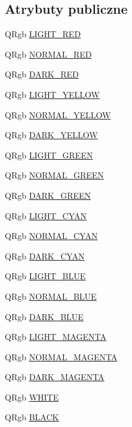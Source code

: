 \subsection*{Atrybuty publiczne}
\begin{CompactItemize}
\item 
QRgb \hyperlink{classPColorManager_cbc4c8b260f0ba856d8454ae2f9320d5}{LIGHT\_\-RED}
\item 
QRgb \hyperlink{classPColorManager_c6f06fc1bb188fe7d7f573ff3c46df8d}{NORMAL\_\-RED}
\item 
QRgb \hyperlink{classPColorManager_3690840932799e3d910dd3d673f90363}{DARK\_\-RED}
\item 
QRgb \hyperlink{classPColorManager_945305800d979369bb29d9f3ec5fe7f3}{LIGHT\_\-YELLOW}
\item 
QRgb \hyperlink{classPColorManager_a1086408be008b97df57f579702d624e}{NORMAL\_\-YELLOW}
\item 
QRgb \hyperlink{classPColorManager_347da61b74a87e7eed4b8849a8128e11}{DARK\_\-YELLOW}
\item 
QRgb \hyperlink{classPColorManager_45eba1a3facb6995710a2d1e9026ca7c}{LIGHT\_\-GREEN}
\item 
QRgb \hyperlink{classPColorManager_a2e75d69d65d6a7f87a470c0782a7624}{NORMAL\_\-GREEN}
\item 
QRgb \hyperlink{classPColorManager_ec8d0fe14a68b42be5c5d8d77f914411}{DARK\_\-GREEN}
\item 
QRgb \hyperlink{classPColorManager_4b0005532d50c98afdbde28fb3081e47}{LIGHT\_\-CYAN}
\item 
QRgb \hyperlink{classPColorManager_9b51000ba56bf9a5f0581fd6c9a51ab6}{NORMAL\_\-CYAN}
\item 
QRgb \hyperlink{classPColorManager_d7dcde24002d9fa0ee9600d37720a930}{DARK\_\-CYAN}
\item 
QRgb \hyperlink{classPColorManager_861249c4294f958c0043a1d1b7468435}{LIGHT\_\-BLUE}
\item 
QRgb \hyperlink{classPColorManager_530893a4eed2d71ce67dff0d500bd0d6}{NORMAL\_\-BLUE}
\item 
QRgb \hyperlink{classPColorManager_2d7a0c5c065fa5b662cb53748e5347ed}{DARK\_\-BLUE}
\item 
QRgb \hyperlink{classPColorManager_435503e14622c3bf22d82a4c5ac12884}{LIGHT\_\-MAGENTA}
\item 
QRgb \hyperlink{classPColorManager_28bb798b6307bd6b6bdd59204f3dc131}{NORMAL\_\-MAGENTA}
\item 
QRgb \hyperlink{classPColorManager_eabafba23c771c3ad19f67938e11f68b}{DARK\_\-MAGENTA}
\item 
QRgb \hyperlink{classPColorManager_c15cc3f24bec369e9e30fee77ca8899a}{WHITE}
\item 
QRgb \hyperlink{classPColorManager_13278cb96706ed743a3f86a6cf4232cb}{BLACK}
\end{CompactItemize}


